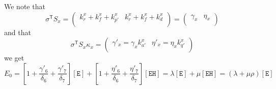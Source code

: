 \documentclass[aps,onecolumn,11pt]{revtex4}
\newcommand{\mychem}[1]{\mathtt{#1}}
\newcommand{\myconc}[1]{\left\lbrack{#1}\right\rbrack}
\newcommand{\EHin}{\myconc{\mychem{EH}}}
\newcommand{\Eout}{\myconc{\mychem{E}}}
\newcommand{\mytrn}[1]{{#1}^{\mathsf{T}}}
\begin{document}
We note that
\begin{equation}
	\mytrn{\sigma}{S_x} =
	\begin{pmatrix}
	k_r^x + k_f^x + k_{p'}^x & k_r^x + k_f^x + k_d^x\\
	\end{pmatrix}
	=
	\begin{pmatrix}
		\gamma_x & \eta_x\\
	\end{pmatrix}
\end{equation}
and that
\begin{equation}
	\mytrn{\sigma}{S_x}\kappa_x = \begin{pmatrix}
		\gamma'_x = \gamma_x k_{a'}^x & \eta'_x = \eta_x k_{q'}^x\\
	\end{pmatrix}
\end{equation}
we get
\begin{equation}
	E_0 = \left\lbrack
	1 + \dfrac{\gamma'_6}{\delta_6} + \dfrac{\gamma'_7}{\delta_7}
	\right\rbrack \Eout
	+
	\left\lbrack
	1 + \dfrac{\eta'_6}{\delta_6} + \dfrac{\eta'_7}{\delta_7}
	\right\rbrack \EHin
	= \lambda\Eout + \mu\EHin = \left(\lambda + \mu \rho\right) \Eout
\end{equation}
\end{document}
